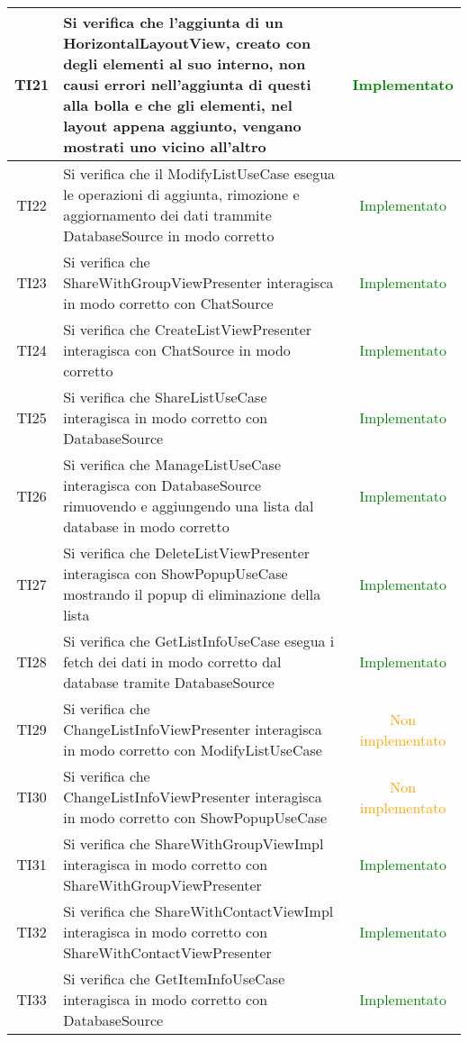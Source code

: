 \begin{center}
\begin{longtable}{|c|>{\centering}m{10cm}|c|}
		TI21 & Si verifica che l'aggiunta di un HorizontalLayoutView, creato con degli elementi al suo interno, non causi errori nell'aggiunta di questi alla bolla e che gli elementi, nel layout appena aggiunto, vengano mostrati uno vicino all'altro & \textcolor{Green}{Implementato}\\ \hline
		TI22 & Si verifica che il ModifyListUseCase esegua le operazioni di aggiunta, rimozione e aggiornamento dei dati trammite DatabaseSource in modo corretto & \textcolor{Green}{Implementato}\\ \hline
		TI23 & Si verifica che ShareWithGroupViewPresenter interagisca in modo corretto con ChatSource & \textcolor{Green}{Implementato}\\ \hline
		TI24 & Si verifica che CreateListViewPresenter interagisca con ChatSource in modo corretto & \textcolor{Green}{Implementato}\\ \hline
		TI25 & Si verifica che ShareListUseCase interagisca in modo corretto con DatabaseSource & \textcolor{Green}{Implementato}\\ \hline
		TI26 & Si verifica che ManageListUseCase interagisca con DatabaseSource rimuovendo e aggiungendo una lista dal database in modo corretto & \textcolor{Green}{Implementato}\\ \hline
		TI27 & Si verifica che DeleteListViewPresenter interagisca con ShowPopupUseCase mostrando il popup di eliminazione della lista & \textcolor{Green}{Implementato}\\ \hline
		TI28 & Si verifica che GetListInfoUseCase esegua i fetch dei dati in modo corretto dal database tramite DatabaseSource & \textcolor{Green}{Implementato}\\ \hline
		TI29 & Si verifica che ChangeListInfoViewPresenter interagisca in modo corretto con ModifyListUseCase & \textcolor{Orange}{Non implementato}\\ \hline
		TI30 & Si verifica che ChangeListInfoViewPresenter interagisca in modo corretto con ShowPopupUseCase & \textcolor{Orange}{Non implementato}\\ \hline
		TI31 & Si verifica che ShareWithGroupViewImpl interagisca in modo corretto con ShareWithGroupViewPresenter & \textcolor{Green}{Implementato}\\ \hline
		TI32 & Si verifica che ShareWithContactViewImpl interagisca in modo corretto con ShareWithContactViewPresenter & \textcolor{Green}{Implementato}\\ \hline
		TI33 & Si verifica che GetItemInfoUseCase interagisca in modo corretto con DatabaseSource & \textcolor{Green}{Implementato}\\ \hline

\end{longtable}
\end{center}
